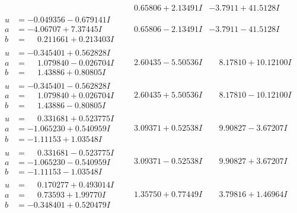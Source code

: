 \documentclass[1p]{elsarticle_modified}
\theoremstyle{definition}
\begin{document}
$$\begin{array}{c|c|c}
 & \phantom{-}0.65806 + 2.13491 I & -3.7911 + 41.5128 I \\ \hline\begin{aligned}
u &= -0.049356 - 0.679141 I \\
a &= -4.06707 + 7.37445 I \\
b &= \phantom{-}0.211661 + 0.213403 I\end{aligned}
 & \phantom{-}0.65806 - 2.13491 I & -3.7911 - 41.5128 I \\ \hline\begin{aligned}
u &= -0.345401 + 0.562828 I \\
a &= \phantom{-}1.079840 - 0.026704 I \\
b &= \phantom{-}1.43886 + 0.80805 I\end{aligned}
 & \phantom{-}2.60435 - 5.50536 I & \phantom{-}8.17810 + 10.12100 I \\ \hline\begin{aligned}
u &= -0.345401 - 0.562828 I \\
a &= \phantom{-}1.079840 + 0.026704 I \\
b &= \phantom{-}1.43886 - 0.80805 I\end{aligned}
 & \phantom{-}2.60435 + 5.50536 I & \phantom{-}8.17810 - 10.12100 I \\ \hline\begin{aligned}
u &= \phantom{-}0.331681 + 0.523775 I \\
a &= -1.065230 + 0.540959 I \\
b &= -1.11153 + 1.03548 I\end{aligned}
 & \phantom{-}3.09371 + 0.52538 I & \phantom{-}9.90827 - 3.67207 I \\ \hline\begin{aligned}
u &= \phantom{-}0.331681 - 0.523775 I \\
a &= -1.065230 - 0.540959 I \\
b &= -1.11153 - 1.03548 I\end{aligned}
 & \phantom{-}3.09371 - 0.52538 I & \phantom{-}9.90827 + 3.67207 I \\ \hline\begin{aligned}
u &= \phantom{-}0.170277 + 0.493014 I \\
a &= \phantom{-}0.73593 + 1.99770 I \\
b &= -0.348401 + 0.520479 I\end{aligned}
 & \phantom{-}1.35750 + 0.77449 I & \phantom{-}3.79816 + 1.46964 I \\ \hline\begin{aligned}

\end{aligned}
\end{array}$$
\end{document}
